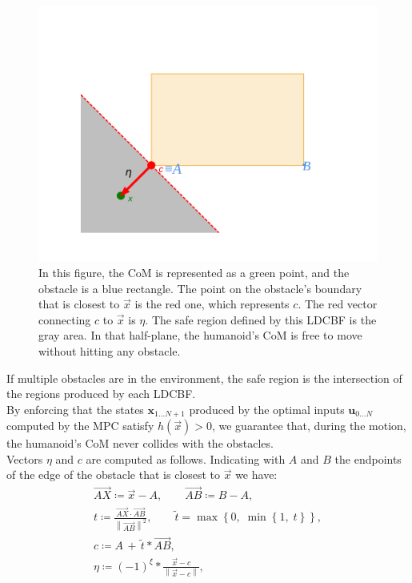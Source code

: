 \begin{figure}[h]
    \centering
    \includegraphics[width=0.75\linewidth]{figures//MPC/example_lcbf2.pdf}
    \caption{In this figure, the CoM is represented as a green point, and the obstacle is a blue rectangle. The point on the obstacle's boundary that is closest to $\vec{x}$ is the red one, which represents $c$. The red vector connecting $c$ to $\vec{x}$ is $\eta$. The safe region defined by this LDCBF is the gray area. In that half-plane, the humanoid's CoM is free to move without hitting any obstacle.}
    \label{fig:example_LDCBF}
\end{figure}

If multiple obstacles are in the environment, the safe region is the intersection of the regions produced by each LDCBF.\\
By enforcing that the states $\mathbf{x}_{1...N+1}$ produced by the optimal inputs $\mathbf{u}_{0...N}$ computed by the MPC satisfy $h(\vec{x})>0$, we guarantee that, during the motion, the humanoid's CoM never collides with the obstacles.\\

Vectors $\eta$ and $c$ are computed as follows. Indicating with $A$ and $B$ the endpoints of the edge of the obstacle that is closest to $\vec{x}$ we have:
\begin{gather*}
    \overrightarrow{AX} \coloneqq \vec{x} - A, \qquad \overrightarrow{AB} \coloneqq B - A, \\
    t \coloneqq \frac{\overrightarrow{AX} \cdot \overrightarrow{AB}}{\left\lVert \overrightarrow{AB} \right\rVert ^2}, \qquad \tilde{t} = \max \left\{0,\; \min \left\{ 1,\; t\right\}\right\}, \\
    c \coloneqq A\, +\, \tilde{t}*\overrightarrow{AB}, \\
    \eta \coloneqq \left(-1\right)^{\xi} * \frac{\vec{x} - c}{\left\lVert \vec{x} - c \right\rVert},
\end{gather*}

